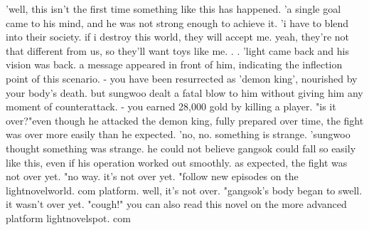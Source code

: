 'well, this isn't the first time something like this has happened.
'a single goal came to his mind, and he was not strong enough to achieve it.
'i have to blend into their society.
 if i destroy this world, they will accept me.
 yeah, they're not that different from us, so they'll want toys like me.
.
.
'light came back and his vision was back.
 a message appeared in front of him, indicating the inflection point of this scenario.
- you have been resurrected as 'demon king', nourished by your body's death.
but sungwoo dealt a fatal blow to him without giving him any moment of counterattack.
 - you earned 28,000 gold by killing a player.
"is it over?"even though he attacked the demon king, fully prepared over time, the fight was over more easily than he expected.
 'no, no.
 something is strange.
'sungwoo thought something was strange.
 he could not believe gangsok could fall so easily like this, even if his operation worked out smoothly.
as expected, the fight was not over yet.
 "no way.
 it's not over yet.
"follow new episodes on the lightnovelworld.
com platform.
well, it's not over.
"gangsok's body began to swell.
 it wasn't over yet.
"cough!" you can also read this novel on the more advanced platform lightnovelspot.
com

 